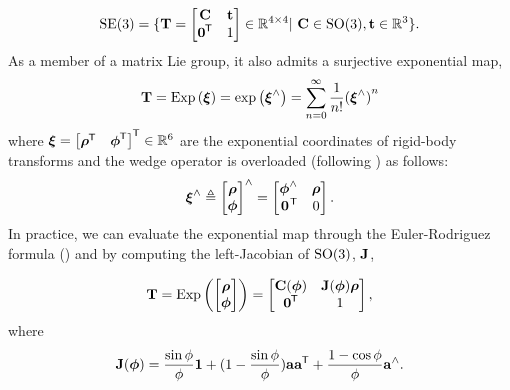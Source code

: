 \begin{equation}
\LieGroupSE{3} = \{ \Transform = \bbm \Rotation & \Vector{t} \\ \Vector{0}^\Tr & 1 \ebm \in \Real{}^{4 \times 4} | ~  \Rotation \in \LieGroupSO{3},  \Vector{t} \in \Real{}^3  \}.
\end{equation}
As a member of a matrix Lie group, it also admits a surjective exponential map,
\begin{equation}
\Transform = \MatExp{\Vector{\xi}} = \Matexp{\Vector{\xi}} = \sum_{n=0}^{\infty}  \frac{1}{n!} {(\Vector{\xi}^\wedge)}^n	
\end{equation}
where $\TransformVector = \bbm \Vector{\rho}^\Tr & \Vector{\phi}^\Tr \ebm^\Tr \in \Real{}^6$ are the exponential coordinates of rigid-body transforms and the wedge operator is overloaded (following \cite{Barfoot2017-ri}) as follows:
\begin{equation}
  \Vector \xi^\wedge \triangleq \bbm \Vector \rho \\ \Vector \phi \ebm ^\wedge = \bbm
  \Vector \phi^\wedge & \Vector \rho \\ \Transpose{\Vector{0}} &  0 \ebm.	
\end{equation}
In practice, we can evaluate the exponential map through the Euler-Rodriguez formula () and by computing the left-Jacobian of $\LieGroupSO{3}$,  $\LeftJacobianSO$, 

\begin{equation}
\Transform = \MatExp{\bbm \Vector \rho \\ \Vector \phi \ebm} = \bbm \Rotation(\RotationVector) & \LeftJacobianSO(\RotationVector) \Vector{\rho} \\ \Vector{0}^\Tr & 1 \ebm,
\end{equation}
where
\begin{equation}
\LeftJacobianSO(\RotationVector) = \frac{\sin{\phi}}{\phi} \IdentityMatrix + (1 - \frac{\sin{\phi}}{\phi}) \RotationAxisVector\RotationAxisVector^\Tr + \frac{1 - \cos{\phi}}{\phi} \RotationAxisVector^\wedge.
\end{equation}




